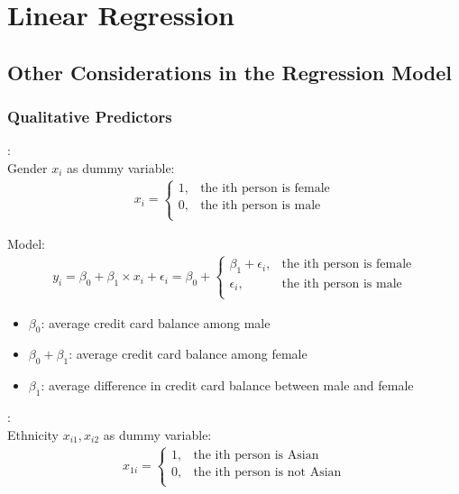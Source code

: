     \documentclass[12pt,fleqn,a4paper]{article}%
\theoremstyle{definition}
\theoremstyle{plain}
\numberwithin{equation}{section}
\begin{document}
\setcounter{section}{1}
\section{Linear Regression}
\label{Linear Regression}
\subsection{\textbf{Other Considerations in the Regression Model}}
\subsubsection{\textbf{Qualitative Predictors}}

\textbf{\color{blue}{Predictors with Two levels}}:\\
Gender $x_{i}$ as dummy variable:\\
\begin{gather}
x_{i} = \left\{
\begin{array}{ll}
1, & \mbox{the ith person is female}\\
0, & \mbox{the ith person is male}\\
\end{array} \right.
\end{gather}

Model: 
\begin{gather}
y_{i} = \beta_{0}+\beta_{1} \times x_{i} + \epsilon_{i} = \beta_{0} + \left\{
\begin{array}{ll}
\beta_{1} +\epsilon_{i}, & \mbox{the ith person is female}\\
\epsilon_{i}, & \mbox{the ith person is male}\\
\end{array} \right.
\end{gather}

\begin{itemize}
\item $\beta_{0}$: average credit card balance among male
\item $\beta_{0}+\beta_{1}$: average credit card balance among female
\item $\beta_{1}$: average difference in credit card balance between male and female
\end{itemize}

\textbf{\color{blue}{Predictors with more than Two Levels}}:\\
Ethnicity $x_{i1},x_{i2}$ as dummy variable:\\
\begin{gather}
x_{1i} = \left\{
\begin{array}{ll}
1, & \mbox{the ith person is Asian}\\
0, & \mbox{the ith person is not Asian}\\
\end{array} \right.
\end{gather}
\end{document}
